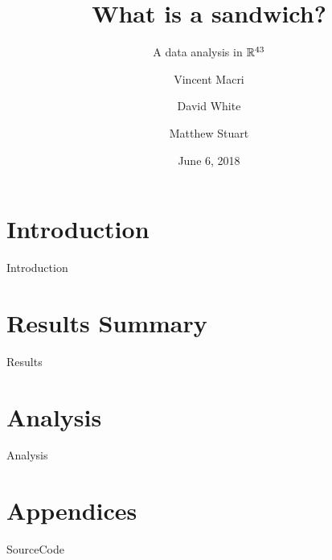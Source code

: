 

\title{What is a sandwich?}
\subtitle{A data analysis in $\mathbb{R}^{43}$}
\author{Vincent Macri \and David White \and Matthew Stuart}
\date{June 6, 2018}


	\maketitle
	
	\tableofcontents
	\clearpage
	\part{Introduction}\label{part:introduction}
		{Introduction}
	\part{Results Summary}\label{part:results}
		{Results}
	\part{Analysis}\label{part:analysis}
		{Analysis}
	\appendix
	\part{Appendices}\label{part:appendix}
		{SourceCode}
	\nocite{*}

